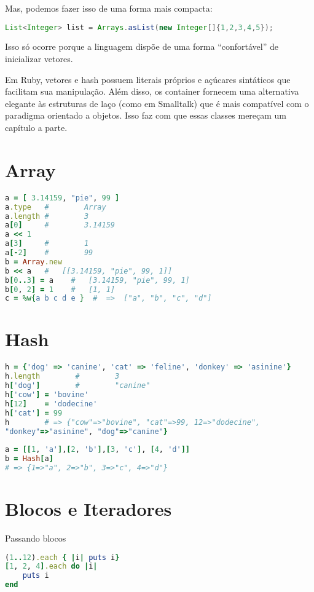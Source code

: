 \documentclass[serif,mathserif]{book}
\begin{document}
Mas, podemos fazer isso de uma forma mais compacta:
\begin{lstlisting}[language=Java]
List<Integer> list = Arrays.asList(new Integer[]{1,2,3,4,5});
\end{lstlisting}
Isso só ocorre porque a linguagem dispõe de uma forma ``confortável'' de inicializar vetores.

Em Ruby, vetores e hash possuem literais próprios e açúcares sintáticos que facilitam sua manipulação. Além disso,
os container fornecem uma alternativa elegante às estruturas de laço (como em Smalltalk) que é mais compatível com o 
paradigma orientado a objetos. Isso faz com que essas classes mereçam um capítulo a parte.

\section{Array}
\begin{lstlisting}[language=ruby]
a = [ 3.14159, "pie", 99 ]
a.type   #        Array
a.length #        3
a[0]     #        3.14159
a << 1
a[3]     #        1
a[-2]    #        99
b = Array.new
b << a   #   [[3.14159, "pie", 99, 1]]
b[0..3] = a    #   [3.14159, "pie", 99, 1]
b[0, 2] = 1    #   [1, 1]
c = %w{a b c d e }  #  =>  ["a", "b", "c", "d"]
\end{lstlisting}


\section{Hash}
\begin{lstlisting}[language=ruby]
h = {'dog' => 'canine', 'cat' => 'feline', 'donkey' => 'asinine'}
h.length        #        3
h['dog']        #        "canine"
h['cow'] = 'bovine'
h[12]    = 'dodecine'
h['cat'] = 99
h        # => {"cow"=>"bovine", "cat"=>99, 12=>"dodecine",
"donkey"=>"asinine", "dog"=>"canine"}
  
a = [[1, 'a'],[2, 'b'],[3, 'c'], [4, 'd']]
b = Hash[a]
# => {1=>"a", 2=>"b", 3=>"c", 4=>"d"}
\end{lstlisting}


\section{Blocos e Iteradores}

Passando blocos
\begin{lstlisting}[language=ruby]
(1..12).each { |i| puts i}
[1, 2, 4].each do |i|
    puts i
end
\end{lstlisting}
\end{document}
